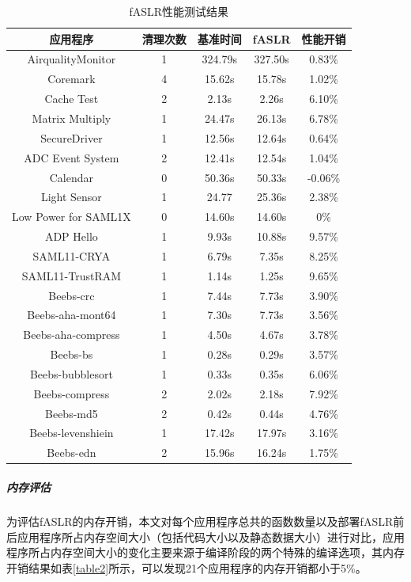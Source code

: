 \documentclass[12pt,a4paper]{ctexart}
\numberwithin{figure}{section}
\begin{document}
\begin{longtable}{ccccc}
	\caption{fASLR性能测试结果}  %
	\label{table1} \\ %
    \hline
    应用程序                 & 清理次数 & 基准时间    & fASLR   & 性能开销    \\ \hline
    AirqualityMonitor    & 1    & 324.79s & 327.50s & 0.83\%  \\ 
    Coremark             & 4    & 15.62s  & 15.78s  & 1.02\%  \\ 
    Cache Test           & 2    & 2.13s   & 2.26s   & 6.10\%  \\ 
    Matrix Multiply      & 1    & 24.47s  & 26.13s  & 6.78\%  \\ 
    SecureDriver         & 1    & 12.56s  & 12.64s  & 0.64\%  \\ 
    ADC Event System     & 2    & 12.41s  & 12.54s  & 1.04\%  \\ 
    Calendar             & 0    & 50.36s  & 50.33s  & -0.06\% \\ 
    Light Sensor         & 1    & 24.77   & 25.36s  & 2.38\%  \\ 
    Low Power for SAML1X & 0    & 14.60s  & 14.60s  & 0\%     \\ 
    ADP Hello            & 1    & 9.93s   & 10.88s  & 9.57\%  \\ 
    SAML11-CRYA          & 1    & 6.79s   & 7.35s   & 8.25\%  \\ 
    SAML11-TrustRAM      & 1    & 1.14s   & 1.25s   & 9.65\%  \\ 
    Beebs-crc            & 1    & 7.44s   & 7.73s   & 3.90\%  \\ 
    Beebs-aha-mont64     & 1    & 7.30s   & 7.73s   & 3.56\%  \\ 
    Beebs-aha-compress   & 1    & 4.50s   & 4.67s   & 3.78\%  \\ 
    Beebs-bs             & 1    & 0.28s   & 0.29s   & 3.57\%  \\ 
    Beebs-bubblesort     & 1    & 0.33s   & 0.35s   & 6.06\%  \\ 
    Beebs-compress       & 2    & 2.02s   & 2.18s   & 7.92\%  \\ 
    Beebs-md5            & 2    & 0.42s   & 0.44s   & 4.76\%  \\ 
    Beebs-levenshiein    & 1    & 17.42s  & 17.97s  & 3.16\%  \\ 
    Beebs-edn            & 2    & 15.96s  & 16.24s  & 1.75\%  \\ \hline
\end{longtable}
\subparagraph{内存评估}
\par 为评估fASLR的内存开销，本文对每个应用程序总共的函数数量以及部署fASLR前后应用程序所占内存空间大小（包括代码大小以及静态数据大小）进行对比，应用程序所占内存空间大小的变化主要来源于编译阶段的两个特殊的编译选项，其内存开销结果如表\ref{table2}所示，可以发现21个应用程序的内存开销都小于5\%。
\end{document}
